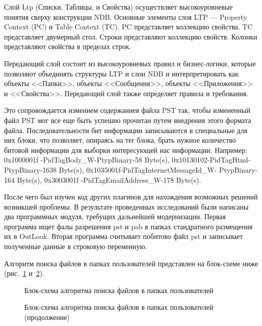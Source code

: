 Слой Ltp (Списки, Таблицы, и Свойства) осуществляет высокоуровневые понятия сверху конструкции NDB. Основные элементы слоя LTP --- Property Context (PC) и Table Context (TC). PC представляет коллекцию 
свойства. TC представляет двумерный стол. Строки представляют коллекцию свойств. 
Колонки представляют свойства в пределах строк.


Передающий слой состоит из высокоуровневых правил и бизнес-логики, которые позволяют объединять структуры 
LTP и слои NDB и интерпретировать как объекты <<Папки>>, объекты <<Сообщения>>, 
объекты <<Приложения>> и <<Свойства>>. Передающий слой также определяет правила и требования.


Это сопровождается измением содержаниея файла PST так, чтобы измененный файл PST мог все еще быть успешно прочитан путем внедрения этого формата файла. 
Последовательности бит информации записываются в специальные  для них блоки,  что позволяет, опираясь на тег блока, брать нужное количество битовой информации для выборки интересующей нас информации.  Например: 0x1000001f -PidTagBody\_W-PtypBinary-58 Byte(s), 0x10130102-PidTagHtml-PtypBinary-1638 Byte(s), 0x1035001f-PidTagInternetMessageId\_W- PtypBinary-164 Byte(s), 0x3003001f -PidTagEmailAddress\_W-178 Byte(s). 


После чего был изучен код других плагинов для нахождения возможных  решений возникшей проблемы. В результате проведенных исследований были написаны два программных модуля, требущих дальнейшей модернизации. Первая программа ищет фалы разрешения pst и pab в папках стандратного размещения их в OutLook. Вторая программа считывает побитово файл pst и записывает полученные данные в строковую переменную.


Алгоритм поиска файлов в папках пользователей представлен на блок-схеме ниже (рис.~\ref{block_1_andrey:block_1_andrey} и~\ref{block_2_andrey:block_2_andrey}).

\begin{figure}[ht]                                                %
\caption{Блок-схема алгоритма поиска файлов в папках пользователей}
\label{block_1_andrey:block_1_andrey}
\end{figure}

\begin{figure}[ht]
\caption{Блок-схема алгоритма поиска файлов в папках пользователей (продолжение)}
\label{block_2_andrey:block_2_andrey}
\end{figure}

